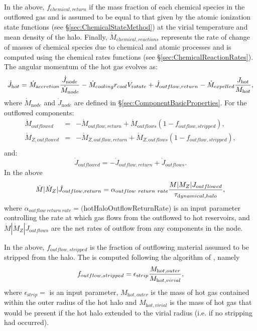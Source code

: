 In the above, $f_{\mathrm chemical,return}$ if the mass fraction of each chemical species in the outflowed gas and is assumed to be equal to that given by the atomic ionization state functions (see \S\ref{sec:ChemicalStateMethod}) at the virial temperature and mean density of the halo. Finally, $\dot{M}_{\mathrm chemical,reactions}$ represents the rate of change of masses of chemical species due to chemical and atomic processes and is computed using the chemical rates functions (see \S\ref{sec:ChemicalReactionRates}). The angular momentum of the hot gas evolves as:
\begin{equation}
 \dot{J}_{\mathrm hot} = \dot{M}_{\mathrm accretion} {\dot{J}_{\mathrm node} \over \dot{M}_{\mathrm node}} - \dot{M}_{\mathrm cooling} r_{\mathrm cool} V_{\mathrm rotate} + \dot{J}_{\mathrm outflow,return} - \dot{M}_{\mathrm expelled} {J_{\mathrm hot} \over M_{\mathrm hot}},
\end{equation}
where $\dot{M}_{\mathrm node}$ and $\dot{J}_{\mathrm node}$ are defined in \S\ref{sec:ComponentBasicProperties}. For the outflowed components:
\begin{eqnarray}
 \dot{M}_{\mathrm outflowed} &=& - \dot{M}_{\mathrm outflow,return} + \dot{M}_{\mathrm outflows} (1-f_{\mathrm outflow, stripped}), \\
 \dot{M}_{Z, {\mathrm outflowed}} &=& - \dot{M}_{Z, {\mathrm outflow,return}} + \dot{M}_{Z, {\mathrm outflows}} (1-f_{\mathrm outflow, stripped}), \\
\end{eqnarray}
and:
\begin{equation}
 \dot{J}_{\mathrm outflowed} = - \dot{J}_{\mathrm outflow,return} + \dot{J}_{\mathrm outflows}.
\end{equation}
In the above
\begin{equation}
 \dot{M}|\dot{M}_Z|\dot{J}_{\mathrm outflow,return} = \alpha_{\mathrm outflow~return~rate} {M|M_Z|J_{\mathrm outflowed}\over \tau_{\mathrm dynamical, halo}},
\end{equation}
where $\alpha_{\mathrm outflow~return~rate}=(${\normalfont \ttfamily hotHaloOutflowReturnRate}) is an input parameter controlling the rate at which gas flows from the outflowed to hot reservoirs, and $\dot{M}|\dot{M}_Z|\dot{J}_{\mathrm outflows}$ are the net rates of outflow from any components in the node.

In the above, $f_{\mathrm outflow, stripped}$ is the fraction of outflowing material assumed to be stripped from the halo. The is computed following the algorithm of \cite{font_colours_2008}, namely
\begin{equation}
f_{\mathrm outflow, stripped} = \epsilon_{\mathrm strip} {M_{\mathrm hot, outer} \over  M_{\mathrm hot, virial}},
\end{equation}
where $\epsilon_{\mathrm strip}=${\normalfont \ttfamily [hotHaloOutflowStrippingEfficiency]} is an input parameter, $M_{\mathrm hot, outer}$ is the mass of hot gas contained within the outer radius of the hot halo and $M_{\mathrm hot, virial}$ is the mass of hot gas that would be present if the hot halo extended to the virial radius (i.e. if no stripping had occurred).

